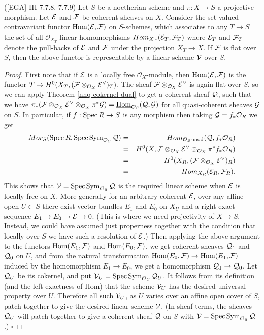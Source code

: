 \begin{theorem}\label{nhq-hom-linear-scheme} {\rm ([EGA] III 7.7.8, 7.7.9) }
Let $S$ be a noetherian scheme and $\pi : X \to S$ a projective
morphism. Let $\mathcal{E}$ and $\mathcal{F}$ be coherent sheaves on $X$.
Consider the set-valued contravariant functor $\operatorname{Hom}(\mathcal{E},\mathcal{F})$ on $S$-schemes,
which associates to any $T\to S$ the set of all ${\mathcal O}_{X_T}$-linear
homomorphisms $Hom_{X_T}(\mathcal{E}_T,\mathcal{F}_T)$ where $\mathcal{E}_T$ and $\mathcal{F}_T$ denote the
pull-backs of $\mathcal{E}$ and $\mathcal{F}$ under the projection $X_T \to X$.
If $\mathcal{F}$ is flat over $S$, then the above functor is representable
by a linear scheme $\mathcal{V}$ over $S$.
\end{theorem}


\begin{proof} First note that if $\mathcal{E}$ is
a locally free ${\mathcal O}_X$-module, then $\operatorname{Hom}(\mathcal{E},\mathcal{F})$ is
the functor $T\mapsto H^0(X_T, (\mathcal{F}\otimes_{{\mathcal O}_X}\mathcal{E}^{\vee})_T)$.
The sheaf $\mathcal{F}\otimes_{{\mathcal O}_X}\mathcal{E}^{\vee}$ is again flat over $S$,
so we can apply Theorem \ref{nhq-cokernel-dual} to
get a coherent sheaf $\mathcal{Q}$, such that we have
$\pi_*(\mathcal{F} \otimes_{{\mathcal O}_X}\mathcal{E}^{\vee}\otimes_{{\mathcal O}_X} \pi^*\mathcal{G}) =
\underline{\operatorname{Hom}}_{{\mathcal O}_S}(\mathcal{Q},\mathcal{G})$ for all quasi-coherent sheaves $\mathcal{G}$ on $S$.
In particular, if $f: \operatorname{Spec} R \to S$ is any morphism then
taking $\mathcal{G} = f_*{{\mathcal O}_R}$ we get
\begin{eqnarray*}
Mor_S(\operatorname{Spec} R, \operatorname{Spec} \operatorname{Sym}_{{\mathcal O}_S}\mathcal{Q} ) & = &
Hom_{{\mathcal O}_S\text{-mod}}(\mathcal{Q},  f_*{{\mathcal O}_R}) \\
& = & H^0(X, \mathcal{F} \otimes_{{\mathcal O}_X}\mathcal{E}^{\vee}\otimes_{{\mathcal O}_X} \pi^*  f_*{{\mathcal O}_R})\\
& = & H^0(X_R, (\mathcal{F} \otimes_{{\mathcal O}_X}\mathcal{E}^{\vee})_R)\\
&= &  Hom_{X_R}(\mathcal{E}_R, \mathcal{F}_R).
\end{eqnarray*}
This shows that $\mathcal{V} = \operatorname{Spec} \operatorname{Sym}_{{\mathcal O}_S} \mathcal{Q} $
is the required linear scheme when $\mathcal{E}$ is locally free on $X$.
More generally for an arbitrary coherent $\mathcal{E}$, over
any affine open $U\subset S$ there exist vector bundles
$E_1$ and $E_0$ on $X_U$ and a right exact sequence
$E_1 \to E_0 \to \mathcal{E} \to 0$. (This is where we need projectivity
of $X\to S$. Instead, we could have assumed just properness together
with the condition that locally over $S$ we have such a resolution of
$\mathcal{E}$.) Then applying the above argument to the functors
$\operatorname{Hom}(E_1,\mathcal{F})$ and $\operatorname{Hom}(E_0,\mathcal{F})$,
we get coherent sheaves $\mathcal{Q}_1$ and $\mathcal{Q}_0$ on
$U$, and from the natural transformation
$\operatorname{Hom}(E_0,\mathcal{F}) \to \operatorname{Hom}(E_1,\mathcal{F})$ induced by the homomorphism
$E_1\to E_0$, we get a homomorphism $\mathcal{Q}_1 \to \mathcal{Q}_0$. Let
$\mathcal{Q}_U$ be its cokernel, and put
$\mathcal{V}_U = \operatorname{Spec} \operatorname{Sym}_{{\mathcal O}_U} \mathcal{Q}_U$. It follows
from its definition (and the left exactness of Hom)
that the scheme $\mathcal{V}_U$ has
the desired universal property over $U$. Therefore all such
$\mathcal{V}_U$, as $U$ varies over an affine open cover of $S$, patch together
to give the desired linear scheme $\mathcal{V}$.
(In sheaf terms, the sheaves $\mathcal{Q}_U$ will patch together to give
a coherent sheaf $\mathcal{Q}$ on $S$ with $\mathcal{V} = \operatorname{Spec} \operatorname{Sym}_{{\mathcal O}_S} \mathcal{Q} $.)
\hfill$\square$\end{proof}
